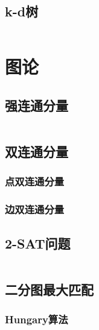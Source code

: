 \documentclass[a4paper]{article}
\newcommand{\cppcode}[1]{
    \inputminted[mathescape]{cpp}{source/#1}
}
\begin{document}


\subsection{k-d树}

\cppcode{data-structure/kd-tree.cpp}

\section{图论}

\subsection{强连通分量}

\cppcode{graph-theory/strongly-connected-components.cpp}

\subsection{双连通分量}

\subsubsection{点双连通分量}

\subsubsection{边双连通分量}

\subsection{2-SAT问题}

\cppcode{graph-theory/two-satisfiability.cpp}

\subsection{二分图最大匹配}

\subsubsection{Hungary算法}
\end{document}
